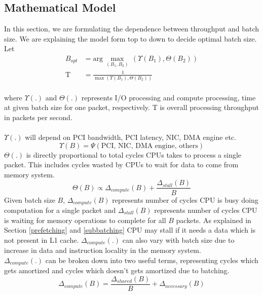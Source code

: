 \subsection{Mathematical Model}
In this section, we are formulating the dependence between throughput and batch size. We are explaining the model form top to down to decide optimal batch size. Let
\begin{align}
B_{opt} &=  \text{arg}\,\max\limits_{(B_1, B_2)}\, (\Upsilon(B_1) , \Theta(B_2)) \label{bopt}
\\
\text{T} &= \frac{1}{\max (\Upsilon(B_1) , \Theta(B_2))} \label{overall_throughput}
\end{align}
\\
where $\Upsilon(.)$ and $\Theta(.)$ represents I/O processing and compute processing, time at given batch size for one packet, respectively. $\text{T}$ is overall processing throughput in packets per second.\\ \\
$\Upsilon(.)$ will depend on PCI bandwidth, PCI latency, NIC, DMA engine etc.
\begin{equation} 
\label{nic_throughput}
\Upsilon(B) = \Psi(\textrm{PCI, NIC, DMA engine, others})
\end{equation}
$\Theta(.)$ is directly proportional to total cycles CPUs takes to process a single packet. This includes cycles wasted by CPUs to wait for data to come from memory system. 
\\
\begin{equation} 
\label{compute_througput}
\Theta(B) \propto \Delta_{compute}(B) + \frac{\Delta_{stall}(B)}{B}
\end{equation}
Given batch size $B$, $\Delta_{compute}(B)$ represents number of cycles CPU is busy doing computation for a single packet and $\Delta_{stall}(B)$ represents number of cycles CPU  is waiting for memory operations to complete for all $B$ packets. As explained in Section \ref{prefetching}  and \ref{subbatching} CPU may stall if it needs a data which is not present in L1 cache. $\Delta_{compute}(.)$ can also vary with batch size due to increase in data and instruction locality in the memory system.
\\
$\Delta_{compute}(.)$ can be broken down into two useful terms, representing cycles which gets amortized and cycles which doesn't gets amortized due to batching.
\\
\begin{equation} 
\label{cycles_compute}
\Delta_{compute}(B) = \frac{\Delta_{shared}(B)}{B} + \Delta_{necessary}(B)
\end{equation}
